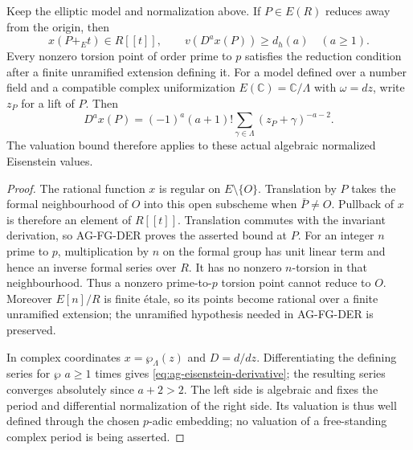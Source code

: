 \begin{proposition}
Keep the elliptic model and normalization above. If $P\in E(R)$
reduces away from the origin, then
\[
 x(P+_E t)\in R[[t]],\qquad
 v(D^a x(P))\ge d_h(a)\quad(a\ge1).
\]
Every nonzero torsion point of order prime to $p$ satisfies the
reduction condition after a finite unramified extension defining
it. For a model defined over a number field and a compatible
complex uniformization $E(\mathbb C)=\mathbb C/\Lambda$ with
$\omega=dz$, write $z_P$ for a lift of $P$. Then
\begin{equation}\label{eq:ag-eisenstein-derivative}
 D^a x(P)=(-1)^a(a+1)!
     \sum_{\gamma\in\Lambda}(z_P+\gamma)^{-a-2}.
\end{equation}
The valuation bound therefore applies to these actual algebraic
normalized Eisenstein values.
\end{proposition}
\begin{proof}
The rational function $x$ is regular on $E\setminus\{O\}$.
Translation by $P$ takes the formal neighbourhood of $O$ into
this open subscheme when $\bar P\ne O$. Pullback of $x$ is
therefore an element of $R[[t]]$. Translation commutes with the
invariant derivation, so AG-FG-DER proves the asserted bound at $P$.
For an integer $n$ prime to $p$, multiplication by $n$ on the
formal group has unit linear term and hence an inverse formal
series over $R$. It has no nonzero $n$-torsion in that
neighbourhood. Thus a nonzero prime-to-$p$ torsion point cannot
reduce to $O$. Moreover $E[n]/R$ is finite \'etale, so its
points become rational over a finite unramified extension;
the unramified hypothesis needed in AG-FG-DER is preserved.

In complex coordinates $x=\wp_\Lambda(z)$ and $D=d/dz$.
Differentiating the defining series for $\wp$ $a\ge1$ times
gives \eqref{eq:ag-eisenstein-derivative}; the resulting series
converges absolutely since $a+2>2$. The left side is algebraic
and fixes the period and differential normalization of the
right side. Its valuation is thus well defined through the
chosen $p$-adic embedding; no valuation of a free-standing
complex period is being asserted.
\end{proof}

